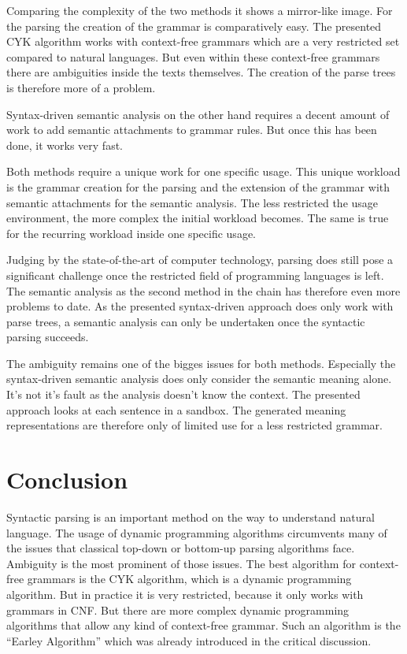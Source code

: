 \documentclass[12pt,twoside]{scrartcl}
\theoremstyle{plain}
\theoremstyle{definition}
\theoremstyle{remark}
\begin{document}
	Comparing the complexity of the two methods it shows a mirror-like image. For the parsing the creation of the grammar is comparatively easy. The presented CYK algorithm works with context-free grammars which are a very restricted set compared to natural languages. But even within these context-free grammars there are ambiguities inside the texts themselves. The creation of the parse trees is therefore more of a problem.
	
	Syntax-driven semantic analysis on the other hand requires a decent amount of work to add semantic attachments to grammar rules. But once this has been done, it works very fast.
	
	Both methods require a unique work for one specific usage. This unique workload is the grammar creation for the parsing and the extension of the grammar with semantic attachments for the semantic analysis. The less restricted the usage environment, the more complex the initial workload becomes. The same is true for the recurring workload inside one specific usage.
	
	Judging by the state-of-the-art of computer technology, parsing does still pose a significant challenge once the restricted field of programming languages is left. The semantic analysis as the second method in the chain has therefore even more problems to date. As the presented syntax-driven approach does only work with parse trees, a semantic analysis can only be undertaken once the syntactic parsing succeeds.
	
	The ambiguity remains one of the bigges issues for both methods. Especially the syntax-driven semantic analysis does only consider the semantic meaning alone. It's not it's fault as the analysis doesn't know the context. The presented approach looks at each sentence in a sandbox. The generated meaning representations are therefore only of limited use for a less restricted grammar.
	
\section{Conclusion}
\label{sec:concl}

	Syntactic parsing is an important method on the way to understand natural language. The usage of dynamic programming algorithms circumvents many of the issues that classical top-down or bottom-up parsing algorithms face. Ambiguity is the most prominent of those issues. The best algorithm for context-free grammars is the CYK algorithm, which is a dynamic programming algorithm. But in practice it is very restricted, because it only works with grammars in CNF. But there are more complex dynamic programming algorithms that allow any kind of context-free grammar. Such an algorithm is the ``Earley Algorithm''\cite[p.~477]{Jurafsky2009b} which was already introduced in the critical discussion.
	
\end{document}
